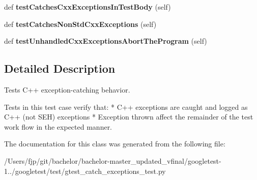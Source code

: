 \begin{DoxyCompactItemize}
def {\bfseries test\+Catches\+Cxx\+Exceptions\+In\+Test\+Body} (self)
\item 
\mbox{\label{classgtest__catch__exceptions__test_1_1_catch_cxx_exceptions_test_a922cb0b598034924c19e6695cc9f7513}} 
def {\bfseries test\+Catches\+Non\+Std\+Cxx\+Exceptions} (self)
\item 
\mbox{\label{classgtest__catch__exceptions__test_1_1_catch_cxx_exceptions_test_af3a794d5af0b3d72789293531468050a}} 
def {\bfseries test\+Unhandled\+Cxx\+Exceptions\+Abort\+The\+Program} (self)
\end{DoxyCompactItemize}


\subsection{Detailed Description}
\begin{DoxyVerb}Tests C++ exception-catching behavior.

   Tests in this test case verify that:
   * C++ exceptions are caught and logged as C++ (not SEH) exceptions
   * Exception thrown affect the remainder of the test work flow in the
     expected manner.
\end{DoxyVerb}
 

The documentation for this class was generated from the following file\+:\begin{DoxyCompactItemize}
\item 
/\+Users/fjp/git/bachelor/bachelor-\/master\+\_\+updated\+\_\+vfinal/googletest-\/1../googletest/test/gtest\+\_\+catch\+\_\+exceptions\+\_\+test.\+py\end{DoxyCompactItemize}
